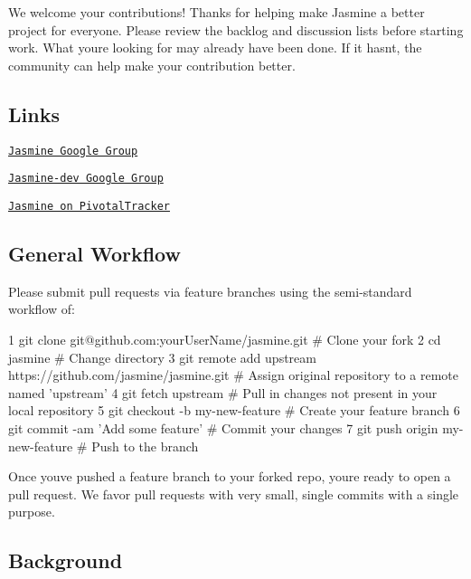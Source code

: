 We welcome your contributions! Thanks for helping make Jasmine a better project for everyone. Please review the backlog and discussion lists before starting work. What you\textquotesingle{}re looking for may already have been done. If it hasn\textquotesingle{}t, the community can help make your contribution better.

\subsection*{Links}


\begin{DoxyItemize}
\item \href{http://groups.google.com/group/jasmine-js}{\tt Jasmine Google Group}
\item \href{http://groups.google.com/group/jasmine-js-dev}{\tt Jasmine-\/dev Google Group}
\item \href{https://www.pivotaltracker.com/n/projects/10606}{\tt Jasmine on Pivotal\+Tracker}
\end{DoxyItemize}

\subsection*{General Workflow}

Please submit pull requests via feature branches using the semi-\/standard workflow of\+:


\begin{DoxyCode}
1 git clone git@github.com:yourUserName/jasmine.git              # Clone your fork
2 cd jasmine                                                     # Change directory
3 git remote add upstream https://github.com/jasmine/jasmine.git # Assign original repository to a remote
       named 'upstream'
4 git fetch upstream                                             # Pull in changes not present in your local
       repository
5 git checkout -b my-new-feature                                 # Create your feature branch
6 git commit -am 'Add some feature'                              # Commit your changes
7 git push origin my-new-feature                                 # Push to the branch
\end{DoxyCode}


Once you\textquotesingle{}ve pushed a feature branch to your forked repo, you\textquotesingle{}re ready to open a pull request. We favor pull requests with very small, single commits with a single purpose.

\subsection*{Background}

